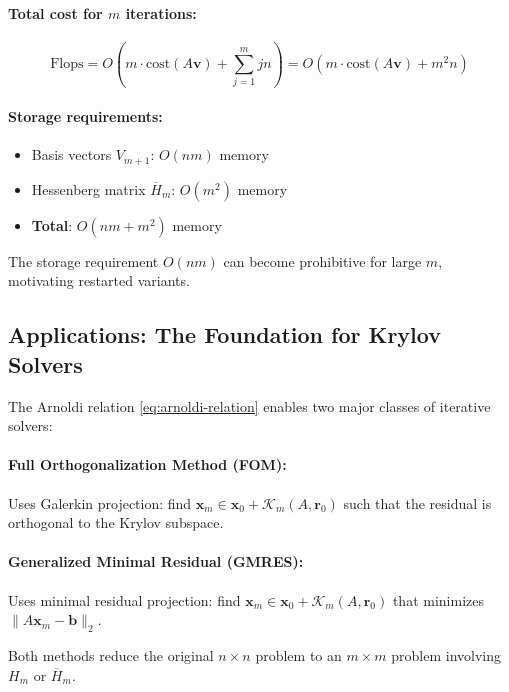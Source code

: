 \paragraph{Total cost for $m$ iterations:}
\[
  \text{Flops} = O\left(m \cdot \text{cost}(A\mathbf{v}) + \sum_{j=1}^m jn\right) = O(m \cdot \text{cost}(A\mathbf{v}) + m^2n)
\]

\paragraph{Storage requirements:}
\begin{itemize}
  \item Basis vectors $V_{m+1}$: $O(nm)$ memory
  \item Hessenberg matrix $\overline{H}_m$: $O(m^2)$ memory
  \item \textbf{Total}: $O(nm + m^2)$ memory
\end{itemize}

The storage requirement $O(nm)$ can become prohibitive for large $m$, motivating restarted variants.

\subsection{Applications: The Foundation for Krylov Solvers}

The Arnoldi relation \eqref{eq:arnoldi-relation} enables two major classes of iterative solvers:

\paragraph{Full Orthogonalization Method (FOM):}
Uses Galerkin projection: find $\mathbf{x}_m \in \mathbf{x}_0 + \mathcal{K}_m(A,\mathbf{r}_0)$ such that the residual is orthogonal to the Krylov subspace.

\paragraph{Generalized Minimal Residual (GMRES):}
Uses minimal residual projection: find $\mathbf{x}_m \in \mathbf{x}_0 + \mathcal{K}_m(A,\mathbf{r}_0)$ that minimizes $\|A\mathbf{x}_m - \mathbf{b}\|_2$.

Both methods reduce the original $n \times n$ problem to an $m \times m$ problem involving $H_m$ or $\overline{H}_m$.

